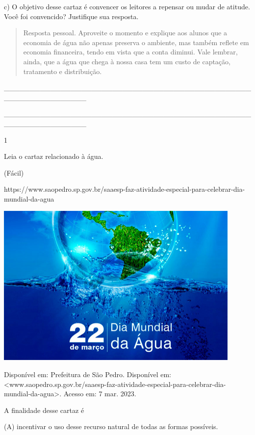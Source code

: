 \begin{itemize}
{{{\begin{itemize}
\begin{itemize}
c) O objetivo desse cartaz é convencer os leitores a repensar ou mudar
de atitude. Você foi convencido? Justifique sua resposta.

\begin{quote}
Resposta pessoal. Aproveite o momento e explique aos alunos que a
economia de água não apenas preserva o ambiente, mas também reflete em
economia financeira, tendo em vista que a conta diminui. Vale lembrar,
ainda, que a água que chega à nossa casa tem um custo de captação,
tratamento e distribuição.
\end{quote}

\_\_\_\_\_\_\_\_\_\_\_\_\_\_\_\_\_\_\_\_\_\_\_\_\_\_\_\_\_\_\_\_\_\_\_\_\_\_\_\_\_\_\_\_\_\_\_\_\_\_\_\_\_\_\_\_\_\_\_\_\_\_\_\_

\_\_\_\_\_\_\_\_\_\_\_\_\_\_\_\_\_\_\_\_\_\_\_\_\_\_\_\_\_\_\_\_\_\_\_\_\_\_\_\_\_\_\_\_\_\_\_\_\_\_\_\_\_\_\_\_\_\_\_\_\_\_\_\_


\num{1}

Leia o cartaz relacionado à água.

(Fácil)

https://www.saopedro.sp.gov.br/saaesp-faz-atividade-especial-para-celebrar-dia-mundial-da-agua

\includegraphics[width=4.75972in,height=3.18681in]{media/image17.png}

Disponível em: Prefeitura de São Pedro. Disponível em:
\textless{}www.saopedro.sp.gov.br/saaesp-faz-atividade-especial-para-celebrar-dia-mundial-da-agua\textgreater{}.
Acesso em: 7 mar. 2023.

A finalidade desse cartaz é

(A) incentivar o uso desse recurso natural de todas as formas possíveis.


\end{itemize}
\end{itemize}}}}
\end{itemize}
